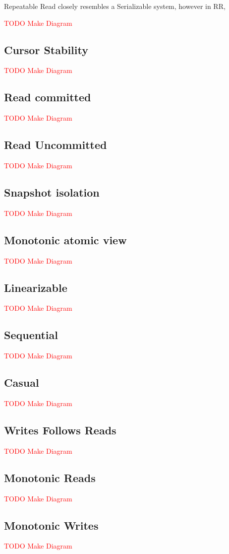 \documentclass[a4paper,10pt,titlepage]{report}
\begin{document}
Repeatable Read closely resembles a Serializable system, however in RR,


\textcolor{red}{TODO Make Diagram}
\subsection{Cursor Stability}
\textcolor{red}{TODO Make Diagram}
\subsection{Read committed}
\textcolor{red}{TODO Make Diagram}
\subsection{Read Uncommitted}
\textcolor{red}{TODO Make Diagram}
\subsection{Snapshot isolation}
\textcolor{red}{TODO Make Diagram}
\subsection{Monotonic atomic view}
\textcolor{red}{TODO Make Diagram}
\subsection{Linearizable}
\textcolor{red}{TODO Make Diagram}
\subsection{Sequential}
\textcolor{red}{TODO Make Diagram}
\subsection{Casual}
\textcolor{red}{TODO Make Diagram}
\subsection{Writes Follows Reads}
\textcolor{red}{TODO Make Diagram}
\subsection{Monotonic Reads}
\textcolor{red}{TODO Make Diagram}
\subsection{Monotonic Writes}
\textcolor{red}{TODO Make Diagram}
\end{document}

